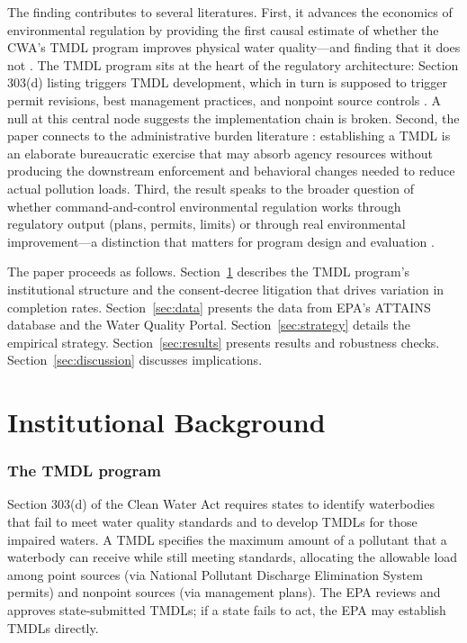 \documentclass[12pt]{article}
\begin{document}
The finding contributes to several literatures. First, it advances the economics of environmental regulation by providing the first causal estimate of whether the CWA's TMDL program improves physical water quality---and finding that it does not \citep{keiser2019, greenstone2012}. The TMDL program sits at the heart of the regulatory architecture: Section 303(d) listing triggers TMDL development, which in turn is supposed to trigger permit revisions, best management practices, and nonpoint source controls \citep{craig2012}. A null at this central node suggests the implementation chain is broken. Second, the paper connects to the administrative burden literature \citep{herd2018, christensen2020}: establishing a TMDL is an elaborate bureaucratic exercise that may absorb agency resources without producing the downstream enforcement and behavioral changes needed to reduce actual pollution loads. Third, the result speaks to the broader question of whether command-and-control environmental regulation works through regulatory output (plans, permits, limits) or through real environmental improvement---a distinction that matters for program design and evaluation \citep{greenstone2004, currie2014}.

The paper proceeds as follows. Section~\ref{sec:background} describes the TMDL program's institutional structure and the consent-decree litigation that drives variation in completion rates. Section~\ref{sec:data} presents the data from EPA's ATTAINS database and the Water Quality Portal. Section~\ref{sec:strategy} details the empirical strategy. Section~\ref{sec:results} presents results and robustness checks. Section~\ref{sec:discussion} discusses implications.


\section{Institutional Background}
\label{sec:background}

\subsubsection*{The TMDL program} Section 303(d) of the Clean Water Act requires states to identify waterbodies that fail to meet water quality standards and to develop TMDLs for those impaired waters. A TMDL specifies the maximum amount of a pollutant that a waterbody can receive while still meeting standards, allocating the allowable load among point sources (via National Pollutant Discharge Elimination System permits) and nonpoint sources (via management plans). The EPA reviews and approves state-submitted TMDLs; if a state fails to act, the EPA may establish TMDLs directly.
\end{document}
